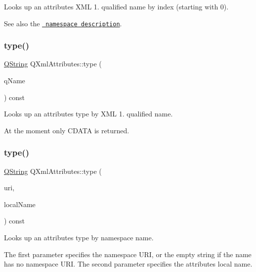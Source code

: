Looks up an attribute\textquotesingle{}s X\+ML 1. qualified name by index (starting with 0).

See also the \href{xml-sax.html\#namespaces}{\texttt{ namespace description}}. \mbox{\label{class_q_xml_attributes_a4429db38a5c429d93919187981e01bc0}} 
\subsubsection{\texorpdfstring{type()}{type()}\hspace{0.1cm}{\footnotesize\ttfamily [1/3]}}
{\footnotesize\ttfamily \mbox{\hyperlink{class_q_string}{Q\+String}} Q\+Xml\+Attributes\+::type (\begin{DoxyParamCaption}\item[{const \mbox{\hyperlink{class_q_string}{Q\+String}} \&}]{q\+Name }\end{DoxyParamCaption}) const}

Looks up an attribute\textquotesingle{}s type by X\+ML 1. qualified name.

At the moment only \textquotesingle{}C\+D\+A\+TA\textquotesingle{} is returned. \mbox{\label{class_q_xml_attributes_abb1c0e26e7f55c8d3296778705e09821}} 
\subsubsection{\texorpdfstring{type()}{type()}\hspace{0.1cm}{\footnotesize\ttfamily [2/3]}}
{\footnotesize\ttfamily \mbox{\hyperlink{class_q_string}{Q\+String}} Q\+Xml\+Attributes\+::type (\begin{DoxyParamCaption}\item[{const \mbox{\hyperlink{class_q_string}{Q\+String}} \&}]{uri,  }\item[{const \mbox{\hyperlink{class_q_string}{Q\+String}} \&}]{local\+Name }\end{DoxyParamCaption}) const}

Looks up an attribute\textquotesingle{}s type by namespace name.

The first parameter specifies the namespace U\+RI, or the empty string if the name has no namespace U\+RI. The second parameter specifies the attribute\textquotesingle{}s local name.

